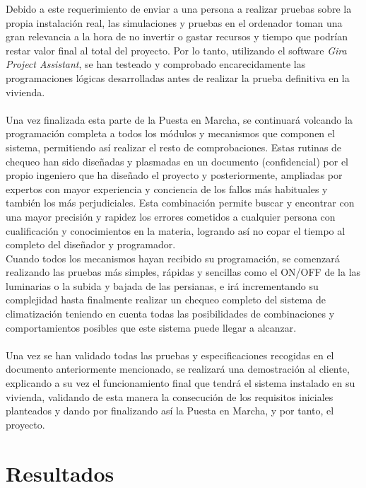 Debido a este requerimiento de enviar a una persona a realizar pruebas sobre la propia instalación real, las simulaciones y pruebas en el ordenador toman una gran relevancia a la hora de no invertir o gastar recursos y tiempo que podrían restar valor final al total del proyecto. Por lo tanto, utilizando el software \textit{Gira Project Assistant}, se han testeado y comprobado encarecidamente las programaciones lógicas desarrolladas antes de realizar la prueba definitiva en la vivienda.\\\\

Una vez finalizada esta parte de la Puesta en Marcha, se continuará volcando la programación completa a todos los módulos y mecanismos que componen el sistema, permitiendo así realizar el resto de comprobaciones. Estas rutinas de chequeo han sido diseñadas y plasmadas en un documento (confidencial) por el propio ingeniero que ha diseñado el proyecto y posteriormente, ampliadas por expertos con mayor experiencia y conciencia de los fallos más habituales y también los más perjudiciales. Esta combinación permite buscar y encontrar con una mayor precisión y rapidez los errores cometidos a cualquier persona con cualificación y conocimientos en la materia, logrando así no copar el tiempo al completo del diseñador y programador. \\

Cuando todos los mecanismos hayan recibido su programación, se comenzará realizando las pruebas más simples, rápidas y sencillas como el ON/OFF de la las luminarias o la subida y bajada de las persianas, e irá incrementando su complejidad hasta finalmente realizar un chequeo completo del sistema de climatización teniendo en cuenta todas las posibilidades de combinaciones y comportamientos posibles que este sistema puede llegar a alcanzar. \\\\
Una vez se han validado todas las pruebas y especificaciones recogidas en el documento anteriormente mencionado, se realizará una demostración al cliente, explicando a su vez el funcionamiento final que tendrá el sistema instalado en su vivienda, validando de esta manera la consecución de los requisitos iniciales planteados y dando por finalizando así la Puesta en Marcha, y por tanto, el proyecto.
\vspace{2cm}

\section{Resultados}

